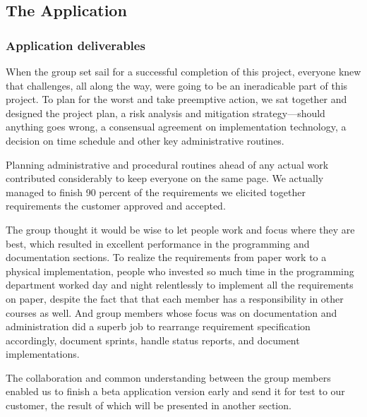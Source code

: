 \subsection{The Application}
    \subsubsection{Application deliverables}
    When the group set sail for a successful completion of this project, everyone knew that challenges, all along the way, were going to be an ineradicable part of this project. To plan for the worst and take preemptive action, we sat together and designed the project plan, a risk analysis and mitigation strategy---should anything goes wrong, a consensual agreement on implementation technology, a decision on time schedule and other key administrative routines.
    
    Planning administrative and procedural routines ahead of any actual work contributed considerably to keep everyone on the same page. We actually managed to finish 90 percent of the requirements we elicited together requirements the customer approved and accepted.
    
    The group thought it would be wise to let people work and focus where they are best, which resulted in excellent performance in the programming and documentation sections. To realize the requirements from paper work to a physical implementation, people who invested so much time in the programming department worked day and night relentlessly to implement all the requirements on paper, despite the fact that that each member has a responsibility in other courses as well. And group members whose focus was on documentation and administration did a superb job to rearrange requirement specification accordingly, document sprints, handle status reports, and document implementations.
    
    The collaboration and common understanding between the group members enabled us to finish a beta application version early and send it for test to our customer, the result of which will be presented in another section.
    

